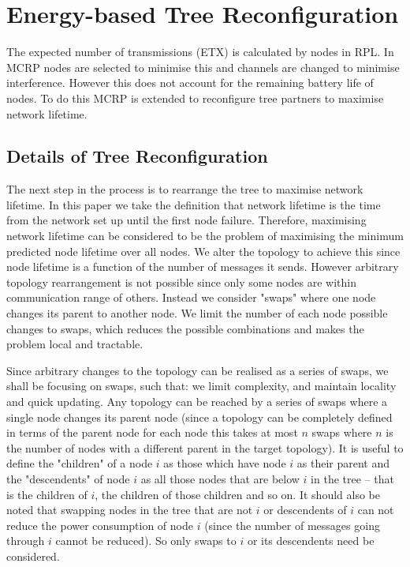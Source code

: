 \section{Energy-based Tree Reconfiguration}
\label{OptimalTree}

The expected number of transmissions (ETX) is calculated by nodes in RPL.  In MCRP nodes are selected to minimise this and channels are changed to minimise interference. However this does not account for the remaining battery life of nodes.  To do this MCRP is extended to reconfigure tree partners to maximise network lifetime.  

\subsection{Details of Tree Reconfiguration}

The next step in the process is to rearrange the tree to maximise network lifetime.  In this paper we take the definition that network lifetime is the time from the network set up until the first node failure.  Therefore, maximising network lifetime can be considered to be the problem of maximising the minimum predicted node lifetime over all nodes.  We alter the topology to achieve this since node lifetime is a function of the number of messages it sends.  However arbitrary topology rearrangement is not possible since only some nodes are within communication range of others.  Instead we consider "swaps" where one node changes its parent to another node. 
We limit the number of each node possible changes to swaps, which reduces the possible combinations and makes the problem local and tractable.

Since arbitrary changes to the topology can be realised as a series of swaps, we shall be focusing on swaps, such that: we limit complexity, and maintain locality and quick updating.
Any topology can be reached by a series of swaps where 
a single node changes its parent node (since a topology can be completely defined in terms of the parent node for each node this takes at most $n$ swaps where $n$ is the number of nodes with a different parent in the target topology).  It is useful to define the "children" of a node $i$ as those which have node $i$ as their parent and the "descendents" of node $i$ as all those nodes that are below $i$ in the tree -- that is the children of $i$, the children of those children and so on.  It should also be noted that swapping nodes in the tree that are not $i$ or descendents of $i$ can not reduce the power consumption of node $i$ (since the number of messages going through $i$ cannot be reduced).  So only swaps to $i$ or its descendents need be considered.

